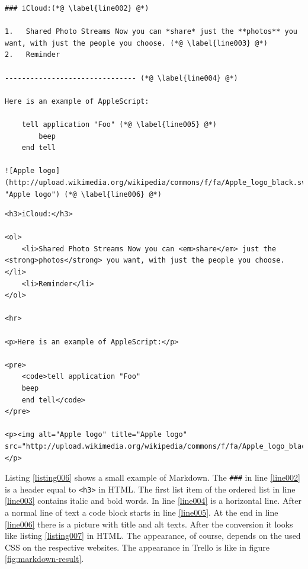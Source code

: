 \begin{lstlisting}[aboveskip=1\baselineskip, style=bash, caption=Example for a text written in Markdown., label=listing006]
### iCloud:(*@ \label{line002} @*)

1.   Shared Photo Streams Now you can *share* just the **photos** you want, with just the people you choose. (*@ \label{line003} @*)
2.   Reminder

------------------------------- (*@ \label{line004} @*)

Here is an example of AppleScript:

    tell application "Foo" (*@ \label{line005} @*)
        beep
    end tell

![Apple logo](http://upload.wikimedia.org/wikipedia/commons/f/fa/Apple_logo_black.svg "Apple logo") (*@ \label{line006} @*)
\end{lstlisting}


\begin{lstlisting}[aboveskip=1\baselineskip, style=html, caption=Listing \ref{listing006} converted to HTML., label=listing007]
<h3>iCloud:</h3>

<ol>
	<li>Shared Photo Streams Now you can <em>share</em> just the <strong>photos</strong> you want, with just the people you choose.</li>
	<li>Reminder</li>
</ol>

<hr>

<p>Here is an example of AppleScript:</p>

<pre>
	<code>tell application "Foo"
	beep
	end tell</code>
</pre>

<p><img alt="Apple logo" title="Apple logo" src="http://upload.wikimedia.org/wikipedia/commons/f/fa/Apple_logo_black.svg"></p>
\end{lstlisting} 

Listing \ref{listing006} shows a small example of Markdown. The \lstinline{###} in line \ref{line002} is a header equal to \lstinline{<h3>} in HTML. The first list item of the ordered list in line \ref{line003} contains italic and bold words. In line \ref{line004} is a horizontal line. After a normal line of text a code block starts in line \ref{line005}. At the end in line \ref{line006} there is a picture with title and alt texts. After the conversion it looks like listing \ref{listing007} in HTML. The appearance, of course, depends on the used CSS on the respective websites. The appearance in Trello is like in figure \ref{fig:markdown-result}.

